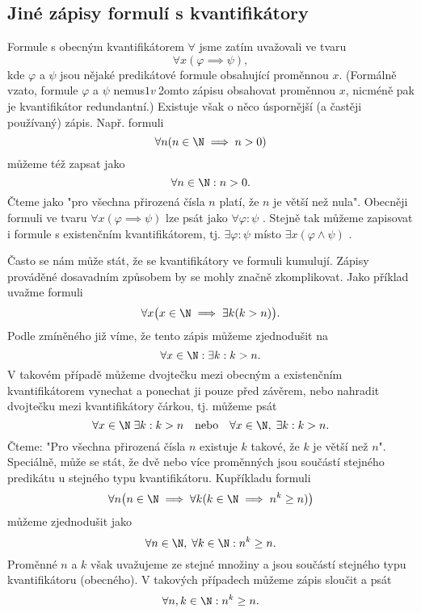 \subsection{Jiné zápisy formulí s kvantifikátory}
Formule s obecným kvantifikátorem $\forall$ jsme zatím uvažovali ve tvaru
\begin{equation*}
    \forall x(\varphi \implies \psi),
\end{equation*}
kde $\varphi$ a $\psi$ jsou nějaké predikátové formule obsahující proměnnou $x$. (Formálně vzato, formule $\varphi$ a $\psi$ nemus$1 v~$2omto zápisu obsahovat proměnnou $x$, nicméně pak je kvantifikátor redundantní.) Existuje však o něco úspornější (a častěji používaný) zápis. Např. formuli
\begin{equation*}
    \forall n (n \in \N \implies n > 0)
\end{equation*}
můžeme též zapsat jako
\begin{equation*}
    \forall n \in \N : n > 0.
\end{equation*}
Čteme jako "pro všechna přirozená čísla $n$ platí, že $n$ je větší než nula". Obecněji formuli ve tvaru $\forall x(\varphi \implies \psi)$ lze psát jako $\forall \varphi : \psi$ . Stejně tak můžeme zapisovat i formule s existenčním kvantifikátorem, tj. $\exists \varphi : \psi$ místo $\exists x (\varphi \land \psi)$ .
\medskip

Často se nám může stát, že se kvantifikátory ve formuli kumulují. Zápisy prováděné dosavadním způsobem by se mohly značně zkomplikovat. Jako příklad uvažme formuli
\begin{equation*}
    \forall x \bigl(x \in \N \implies \exists k (k > n)\bigr).
\end{equation*}
Podle zmíněného již víme, že tento zápis můžeme zjednodušit na
\begin{equation*}
    \forall x \in \N : \exists k : k > n.
\end{equation*}
V takovém případě můžeme dvojtečku mezi obecným a existenčním kvantifikátorem vynechat a ponechat ji pouze před závěrem, nebo nahradit dvojtečku mezi kvantifikátory čárkou, tj. můžeme psát
\begin{equation*}
    \forall x \in \N\;\exists k : k > n\quad\text{nebo}\quad\forall x \in \N ,\;\exists k : k > n.
\end{equation*}
Čteme: "Pro všechna přirozená čísla $n$ existuje $k$ takové, že $k$ je větší než $n$". Speciálně, může se stát, že dvě nebo více proměnných jsou součástí stejného predikátu u stejného typu kvantifikátoru. Kupříkladu formuli
\begin{equation*}
    \forall n \bigl(n\in\N \implies \forall k(k\in\N \implies n^k \geq n)\bigr)
\end{equation*}
můžeme zjednodušit jako
\begin{equation*}
    \forall n\in\N ,\; \forall k\in\N : n^k\geq n.
\end{equation*}
Proměnné $n$ a $k$ však uvažujeme ze stejné množiny a jsou součástí stejného typu kvantifikátoru (obecného). V takových případech můžeme zápis sloučit a psát
\begin{equation*}
    \forall n,k\in\N : n^k\geq n.
\end{equation*}

